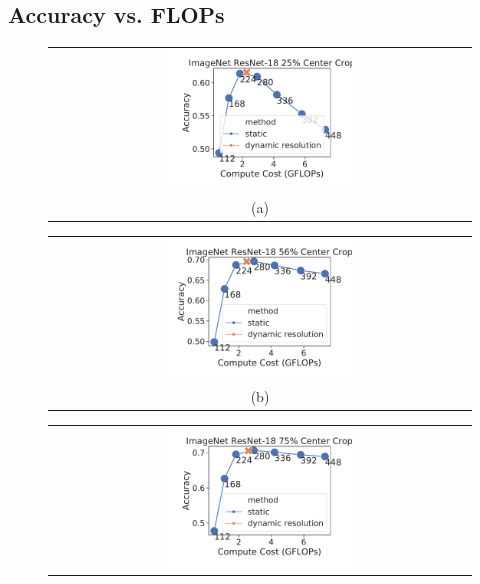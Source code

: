 \subsection{Accuracy vs. FLOPs}
\label{sec:accflops}
\begin{figure}[h!]
    \centering
    \begin{tabular}{@{}c@{}}
    \includegraphics[width=0.45\textwidth]{e2e_figures/imagenet_resnet18_25_center.pdf} \\
    \small (a)
    \end{tabular}
    \begin{tabular}{@{}c@{}}
    \includegraphics[width=0.45\textwidth]{e2e_figures/imagenet_resnet18_56_center.pdf} \\
    \small (b)
    \end{tabular}
    \begin{tabular}{@{}c@{}}
    \includegraphics[width=0.45\textwidth]{e2e_figures/imagenet_resnet18_default_center.pdf} \\

\end{tabular}
\end{figure}
